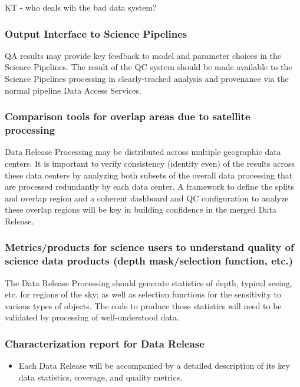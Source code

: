 \documentclass[DM,toc,lsstdraft]{lsstdoc}
\begin{document}
\begin{note}
KT - who deals wih the bad data system?
\end{note}

\subsubsection{Output Interface to Science Pipelines}
\label{sec:qaOutputInterfaceSciencePipelines}

QA results may provide key feedback to model and parameter choices in the Science Pipelines.  The result of the QC system should be made available to the Science Pipelines processing in clearly-tracked analysis and provenance via the normal pipeline Data Access Services.

\subsubsection{Comparison tools for overlap areas due to satellite processing}
\label{sec:qaComparisonSatelliteDataCenters}

Data Release Processing may be distributed across multiple geographic data centers.  It is important to verify consistency (identity even) of the results across these data centers by analyzing both subsets of the overall data processing that are processed redundantly by each data center. A framework to define the splits and overlap region and a coherent dashboard and QC configuration to analyze these overlap regions will be key in building confidence in the merged Data Release.

\subsubsection{Metrics/products for science users to understand quality of science data products (depth mask/selection function, etc.)}
\label{sec:qaScienceUsersMetrics}

The Data Release Processing should generate statistics of depth, typical seeing, etc. for regions of the sky; as well as selection functions for the sensitivity to various types of objects.  The code to produce those statistics will need to be validated by processing of well-understood data.

\subsubsection{Characterization report for Data Release}
\label{sec:qaCharacterizationReportDrp}
\begin{itemize}
\item Each Data Release will be accompanied by a detailed description of its key data statistics, coverage, and quality metrics.
\end{itemize}
\end{document}
